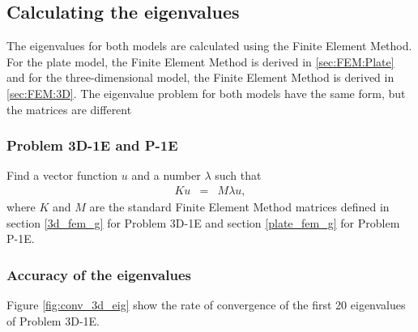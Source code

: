 \documentclass[../../main.tex]{subfiles}
\begin{document}
\begin{figure}[h!]
{{\begin{minipage}[b]{0.8\linewidth}
				
			\end{minipage}
		}
	}
\end{figure}
\FloatBarrier

\subsection{Calculating the eigenvalues}
The eigenvalues for both models are calculated using the Finite Element Method. For the plate model, the Finite Element Method is derived in \ref{sec:FEM:Plate} and for the three-dimensional model, the Finite Element Method is derived in \ref{sec:FEM:3D}. The eigenvalue problem for both models have the same form, but the matrices are different

\subsubsection{Problem 3D-1E and P-1E}
Find a vector function $u$ and a number $\lambda$ such that
\begin{eqnarray}
	K{u} & = & M\lambda{u}, 
\end{eqnarray} where $K$ and $M$ are the standard Finite Element Method matrices defined in section \ref{3d_fem_g} for Problem 3D-1E and section \ref{plate_fem_g} for Problem P-1E.

\subsubsection{Accuracy of the eigenvalues}
Figure \ref{fig:conv_3d_eig} show the rate of convergence of the first 20 eigenvalues of Problem 3D-1E. 
\end{document}
